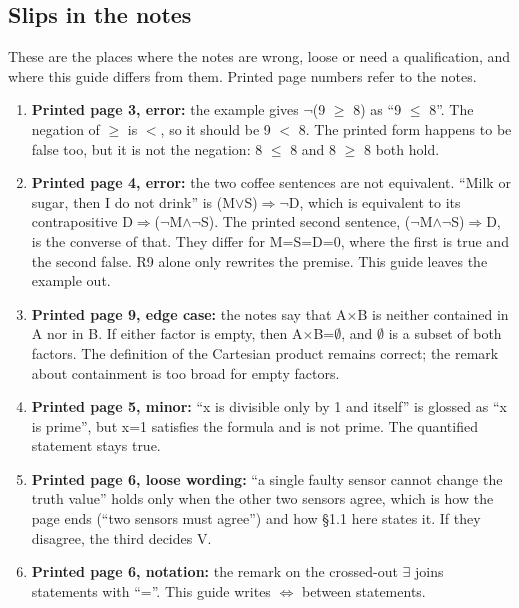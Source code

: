 \documentclass[11pt]{article}
\begin{document}
\begin{keepsection}
\section{Slips in the notes}

These are the places where the notes are wrong, loose or need a qualification, and where this guide differs from them. Printed page numbers refer to the notes.

\begin{enumerate}
\item \textbf{Printed page 3, error:} the example gives \ensuremath{\neg}(9 \ensuremath{\geq} 8) as “9 \ensuremath{\leq} 8”. The negation of \ensuremath{\geq} is \ensuremath{<}, so it should be 9 \ensuremath{<} 8. The printed form happens to be false too, but it is not the negation: 8 \ensuremath{\leq} 8 and 8 \ensuremath{\geq} 8 both hold.
\item \textbf{Printed page 4, error:} the two coffee sentences are not equivalent. “Milk or sugar, then I do not drink” is (M\ensuremath{\lor}S)\ensuremath{\Rightarrow}\ensuremath{\neg}D, which is equivalent to its contrapositive D\ensuremath{\Rightarrow}(\ensuremath{\neg}M\ensuremath{\land}\ensuremath{\neg}S). The printed second sentence, (\ensuremath{\neg}M\ensuremath{\land}\ensuremath{\neg}S)\ensuremath{\Rightarrow}D, is the converse of that. They differ for M=S=D=0, where the first is true and the second false. R9 alone only rewrites the premise. This guide leaves the example out.
\item \textbf{Printed page 9, edge case:} the notes say that A\ensuremath{\times}B is neither contained in A nor in B. If either factor is empty, then A\ensuremath{\times}B=\ensuremath{\emptyset}, and \ensuremath{\emptyset} is a subset of both factors. The definition of the Cartesian product remains correct; the remark about containment is too broad for empty factors.
\item \textbf{Printed page 5, minor:} “x is divisible only by 1 and itself” is glossed as “x is prime”, but x=1 satisfies the formula and is not prime. The quantified statement stays true.
\item \textbf{Printed page 6, loose wording:} “a single faulty sensor cannot change the truth value” holds only when the other two sensors agree, which is how the page ends (“two sensors must agree”) and how §1.1 here states it. If they disagree, the third decides V.
\item \textbf{Printed page 6, notation:} the remark on the crossed-out \ensuremath{\exists} joins statements with “=”. This guide writes \ensuremath{\Leftrightarrow} between statements.

\end{enumerate}
\end{keepsection}
\end{document}
